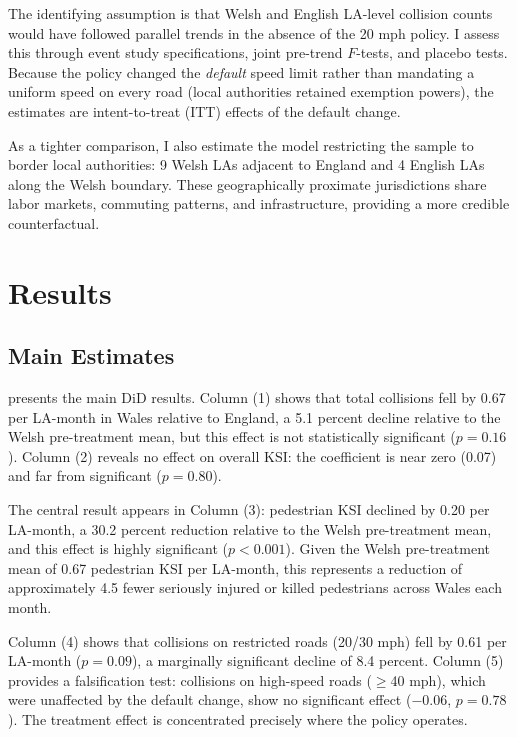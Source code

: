 \documentclass[12pt]{article}
\begin{document}
The identifying assumption is that Welsh and English LA-level collision counts would have followed parallel trends in the absence of the 20 mph policy. I assess this through event study specifications, joint pre-trend $F$-tests, and placebo tests. Because the policy changed the \emph{default} speed limit rather than mandating a uniform speed on every road (local authorities retained exemption powers), the estimates are intent-to-treat (ITT) effects of the default change.

As a tighter comparison, I also estimate the model restricting the sample to border local authorities: 9 Welsh LAs adjacent to England and 4 English LAs along the Welsh boundary. These geographically proximate jurisdictions share labor markets, commuting patterns, and infrastructure, providing a more credible counterfactual.


\section{Results}

\subsection{Main Estimates}

 presents the main DiD results. Column (1) shows that total collisions fell by 0.67 per LA-month in Wales relative to England, a 5.1 percent decline relative to the Welsh pre-treatment mean, but this effect is not statistically significant ($p = 0.16$). Column (2) reveals no effect on overall KSI: the coefficient is near zero (0.07) and far from significant ($p = 0.80$).

The central result appears in Column (3): pedestrian KSI declined by 0.20 per LA-month, a 30.2 percent reduction relative to the Welsh pre-treatment mean, and this effect is highly significant ($p < 0.001$). Given the Welsh pre-treatment mean of 0.67 pedestrian KSI per LA-month, this represents a reduction of approximately 4.5 fewer seriously injured or killed pedestrians across Wales each month.

Column (4) shows that collisions on restricted roads (20/30 mph) fell by 0.61 per LA-month ($p = 0.09$), a marginally significant decline of 8.4 percent. Column (5) provides a falsification test: collisions on high-speed roads ($\geq$40 mph), which were unaffected by the default change, show no significant effect ($-0.06$, $p = 0.78$). The treatment effect is concentrated precisely where the policy operates.
\end{document}
